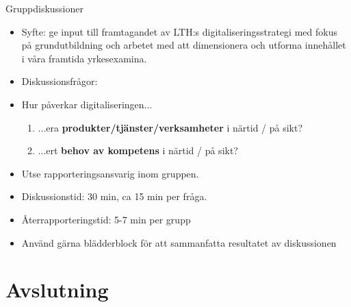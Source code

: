 \documentclass[aspectratio=169]{beamer}
\newenvironment{Slide}[1]%
  {\begin{frame}[environment=Slide]{#1}}
  {\end{frame}}%
\begin{document}
\begin{Slide}{Gruppdiskussioner}
  \begin{itemize}
    \item Syfte: ge input till framtagandet av LTH:s digitaliseringsstrategi med fokus på grundutbildning och arbetet med att dimensionera och utforma innehållet i våra framtida yrkesexamina.
    \item Diskussionsfrågor: \\ 
    \item[] Hur påverkar digitaliseringen...

    \begin{enumerate}
        \item  ...era \textbf{produkter/tjänster/verksamheter} i
        närtid / på sikt?
        
        \item ...ert \textbf{behov av kompetens} i närtid / på
        sikt?
    \end{enumerate}

    \item Utse rapporteringsansvarig inom gruppen.
    \item Diskussionstid: 30 min, ca 15 min per fråga.
    \item Återrapporteringstid: 5-7 min per grupp
    \item Använd gärna blädderblock för att sammanfatta resultatet av diskussionen 
  \end{itemize}
\end{Slide}

\section{Avslutning}
\end{document}
